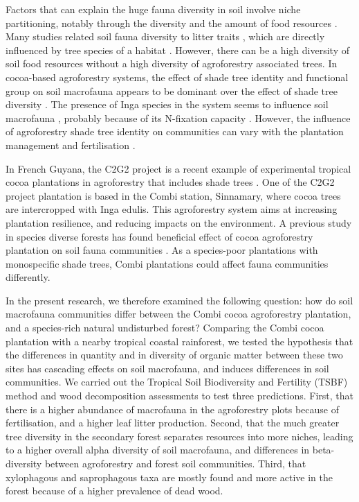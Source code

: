 \documentclass[fleqn,10pt]{ArtEcoFoG} %
\begin{document}
Factors that can explain the huge fauna diversity in soil involve niche partitioning, notably through the diversity and the amount of food resources \citep{Anderson1975, potapov_feeding_2022}. Many studies related soil fauna diversity to litter traits \citep{moco_relationships_2010, laossi_effects_2008}, which are directly influenced by tree species of a habitat \citep{korboulewsky_how_2016, rousseau_shade_2021}. However, there can be a high diversity of soil food resources without a high diversity of agroforestry associated trees. In cocoa-based agroforestry systems, the effect of shade tree identity and functional group on soil macrofauna appears to be dominant over the effect of shade tree diversity \citep{laossi_effects_2008, rousseau_shade_2021, wardle_influence_2006}. The presence of Inga species in the system seems to influence soil macrofauna \citep{rousseau_shade_2021}, probably because of its N-fixation capacity \citep{blanchart_long-term_2006, kaspari_biogeochemistry_2009, rousseau_shade_2021, velasquez_soil_2012}. However, the influence of agroforestry shade tree identity on communities can vary with the plantation management and fertilisation \citep{sauvadet_shade_2019}.

In French Guyana, the C2G2 project is a recent example of experimental tropical cocoa plantations in agroforestry that includes shade trees \citep{saj_projetc2g2_2023}. One of the C2G2 project plantation is based in the Combi station, Sinnamary, where cocoa trees are intercropped with Inga edulis. This agroforestry system aims at increasing plantation resilience, and reducing impacts on the environment. A previous study in species diverse forests has found beneficial effect of cocoa agroforestry plantation on soil fauna communities \citep{da_silva_moco_soil_2009}. As a species-poor plantations with monospecific shade trees, Combi plantations could affect fauna communities differently.

In the present research, we therefore examined the following question: how do soil macrofauna communities differ between the Combi cocoa agroforestry plantation, and a species-rich natural undisturbed forest? Comparing the Combi cocoa plantation with a nearby tropical coastal rainforest, we tested the hypothesis that the differences in quantity and in diversity of organic matter between these two sites has cascading effects on soil macrofauna, and induces differences in soil communities. We carried out the Tropical Soil Biodiversity and Fertility (TSBF) method and wood decomposition assessments to test three predictions. First, that there is a higher abundance of macrofauna in the agroforestry plots because of fertilisation, and a higher leaf litter production. Second, that the much greater tree diversity in the secondary forest separates resources into more niches, leading to a higher overall alpha diversity of soil macrofauna, and differences in beta-diversity between agroforestry and forest soil communities. Third, that xylophagous and saprophagous taxa are mostly found and more active in the forest because of a higher prevalence of dead wood.
\end{document}
